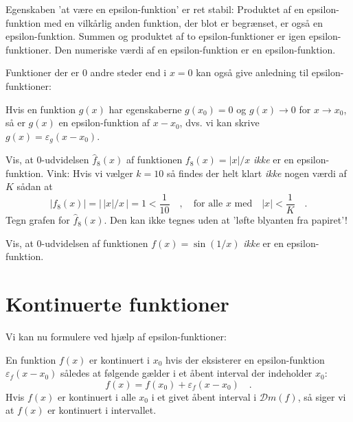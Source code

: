 \begin{aha}
Egenskaben 'at være en epsilon-funktion' er ret stabil:
Produktet af en epsilon-funktion med en vilkårlig anden funktion, der blot er begrænset, er også en epsilon-funktion.
Summen og produktet af to epsilon-funktioner er  igen epsilon-funktioner. Den numeriske værdi
af en epsilon-funktion er en epsilon-funktion.
\end{aha}

Funktioner der er $0$ andre steder end i $x=0$ kan også give anledning til epsilon-funktioner:

\begin{think}
Hvis en funktion $g(x)$ har egenskaberne $g(x_{0}) = 0$ og  $g(x) \to 0$ for $x \to x_{0}$, så er $g(x)$ en epsilon-funktion af $x-x_{0}$, dvs. vi kan skrive $g(x) = \varepsilon_{g}(x-x_{0})$.
\end{think}

\begin{exercise} \label{tn14.exercNumDiv}
Vis, at $0$-udvidelsen $\widehat{f}_{8}(x)$ af funktionen $f_{8}(x) = |x|/x$ \emph{ikke} er en epsilon-funktion. Vink: Hvis vi vælger $k = 10$ så findes der helt klart \emph{ikke} nogen værdi af $K$ sådan at
\begin{equation}
|f_{8}(x)| = |\,|x|/x \,| = 1 < \frac{1}{10}\quad , \quad \textrm{for alle $x$ med} \quad  |x| < \frac{1}{K}\quad .
\end{equation}
Tegn grafen for $\widehat{f}_{8}(x)$. Den kan ikke tegnes uden at 'løfte blyanten fra papiret'!
\end{exercise}


\begin{exercise} \label{tn14.exercSinusWild}
Vis, at $0$-udvidelsen af funktionen $f(x) = \sin(1/x)$ \emph{ikke} er en epsilon-funktion.
\end{exercise}




\section{Kontinuerte funktioner} \label{tn14.secDifferentiation}

Vi kan nu formulere  ved hjælp af epsilon-funktioner:

\begin{definition}[Kontinuitet] \label{tn14.defKont}
En funktion $f(x)$ er kontinuert i $x_{0}$ hvis der eksisterer en
epsilon-funktion $\varepsilon_{f}(x - x_{0})$ således at følgende gælder i et åbent interval der indeholder $x_{0}$:
\begin{equation}
f(x) = f(x_{0}) + \varepsilon_{f}(x - x_{0}) \quad .
\end{equation}
Hvis $f(x)$ er kontinuert i alle $x_{0}$ i et givet åbent interval i $\mathcal{D}m(f)$, så siger vi at $f(x)$ er kontinuert i intervallet.
\end{definition}

